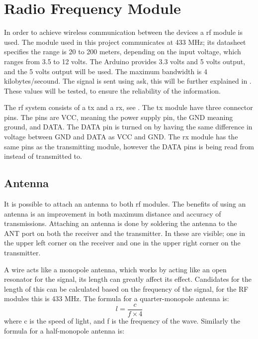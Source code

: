 \section{Radio Frequency Module} \label{rfmodule}
In order to achieve wireless communication between the devices a \gls{rf} module is used.
The module used in this project communicates at 433 MHz; its datasheet specifies the range is 20 to 200 meters, depending on the input voltage, which ranges from 3.5 to 12 volts. 
The Arduino provides 3.3 volts and 5 volts output, and the 5 volts output will be used.
The maximum bandwidth is 4 kilobytes/secound. 
The signal is sent using \gls{ask}, this will be further explained in .
These values will be tested, to ensure the reliability of the information. 

The \gls{rf} system consists of a \gls{tx} and a \gls{rx}, see .
The \gls{tx} module have three connector pins.
The pins are VCC, meaning the power supply pin, the GND meaning ground, and DATA.
The DATA pin is turned on by having the same difference in voltage between GND and DATA as VCC and GND. 
The \gls{rx} module has the same pins as the transmitting module, however the DATA pins is being read from instead of transmitted to.


\subsection{Antenna}
It is possible to attach an antenna to both \gls{rf} modules. 
The benefits of using an antenna is an improvement in both maximum distance and accuracy of transmissions.
Attaching an antenna is done by soldering the antenna to the ANT port on both the receiver and the transmitter. 
In  these are visible; one in the upper left corner on the receiver and one in the upper right corner on the transmitter. 

A wire acts like a monopole antenna, which works by acting like an open resonator for the signal, its length can greatly affect its effect. 
Candidates for the length of this can be calculated based on the frequency of the signal, for the RF modules this is 433 MHz.
The formula for a quarter-monopole antenna is: 
\begin{equation} \label{QMA}
l = \frac{c}{f \times 4}
\end{equation}
where c is the speed of light, and f is the frequency of the wave.
Similarly the formula for a half-monopole antenna is: 

